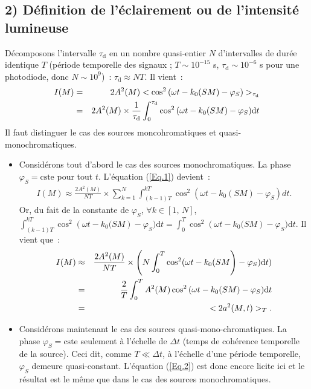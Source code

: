 \documentclass{article}
\begin{document}
\subsection*{2)  Définition de l'éclairement ou de l'intensité
lumineuse} Décomposons l'intervalle $\tau_{\mathrm{d}}$ en un nombre
quasi-entier $N$ d'intervalles de durée identique $T$ (période
temporelle des signaux ; $T\sim 10^{-15}$ s, $\tau_{\mathrm{d}} \sim 10^{-6}$
s pour une photodiode, donc $N \sim 10^{9}$) : $\tau_{\mathrm{d}} \approx
NT$. Il vient :
\begin{eqnarray}\label{Eq.1}
I(M) &=& 2A^{2}(M)<\cos^{2}\left(\omega t
-k_{0}(SM\right)-\varphi_{S})>_{\mathrm{\tau_{\mathrm{d}}}} \notag \\
&=& 2A^{2}(M)\times
\frac{1}{\tau_{\mathrm{d}}}\int_{0}^{\tau_{\mathrm{d}}}\cos^{2}\left(\omega t
-k_{0}(SM\right)-\varphi_{S})\mathrm{d}t \notag \\
\end{eqnarray}
Il faut distinguer le cas des sources moncohromatiques et
quasi-monochromatiques.
\begin{itemize}
\item Considérons tout d'abord le cas des sources monochromatiques. La
phase $\varphi_{S} = \mathrm{cste}$ pour tout $t$. L'équation (\ref{Eq.1})
devient :
\begin{eqnarray*}
I(M) \approx \frac{2A^{2}(M)}{NT}\times
\sum_{k=1}^{N}\int_{(k-1)T}^{kT}\cos^{2}(\omega t
-k_{0}(SM)-\varphi_{S})dt.
\end{eqnarray*}
Or, du fait de la constante de $\varphi_{S}$, $\forall k \in
\left[1,\,N\right]$, $\int_{(k-1)T}^{kT}\cos^{2}\left(\omega t
-k_{0}(SM\right)-\varphi_{S})\mathrm{d}t = \int_{0}^{T}\cos^{2}\left(\omega t
-k_{0}(SM\right)-\varphi_{S})\mathrm{d}t$. Il vient que :
\begin{eqnarray}\label{Eq.2}
I(M) &\approx& \frac{2A^{2}(M)}{NT}\times
\left(N\int_{0}^{T}\cos^{2}(\omega t -k_{0}(SM\right)-\varphi_{S})\mathrm{d}t) \notag \\
&=& \frac{2}{T}\int_{0}^{T}A^{2}(M)\cos^{2}\left(\omega t
-k_{0}(SM\right)-\varphi_{S})\mathrm{d}t \notag \\
&=& <2a^{2}(M,t)>_{T}.
\end{eqnarray}
\item Considérons maintenant le cas des sources quasi-mono-chromatiques. La
phase $\varphi_{S} = \mathrm{cste}$ seulement à l'échelle de $\Delta t$
(temps de cohérence temporelle de la source). Ceci dit, comme $T \ll
\Delta t$, à l'échelle d'une période temporelle, $\varphi_{S}$
demeure quasi-constant. L'équation (\ref{Eq.2}) est donc encore
licite ici et le résultat est le même que dans le cas des sources
monochromatiques.
\end{itemize}
\end{document}
